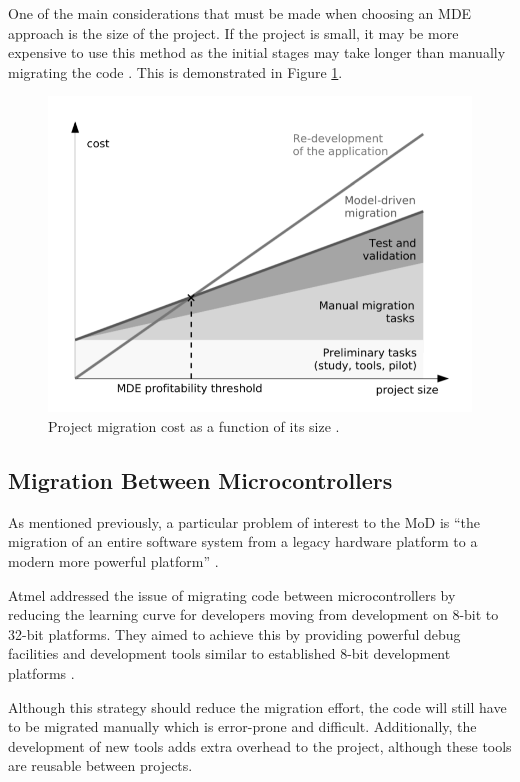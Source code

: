 \documentclass{UoYCSproject}
\begin{document}
One of the main considerations that must be made when choosing an MDE approach is the size of the project. If the project is small, it may be more expensive to use this method as the initial stages may take longer than manually migrating the code \parencite{fleurey2007model}. This is demonstrated in Figure \ref{fig:costvsize}.

\begin{figure}[h!]
  \centering
  \includegraphics[width=0.6\linewidth]{graphics/costvsize.png}
  \caption{Project migration cost as a function of its size \parencite{fleurey2007model}.}
  \label{fig:costvsize}
\end{figure}

\subsection{Migration Between Microcontrollers} \label{mc_migration}
As mentioned previously, a particular problem of interest to the MoD is ``the migration of an entire software system from a legacy hardware platform to a modern more powerful platform'' \parencite{gerasimou2017technical}.

Atmel addressed the issue of migrating code between microcontrollers by reducing the learning curve for developers moving from development on 8-bit to 32-bit platforms. They aimed to achieve this by providing powerful debug facilities and development tools similar to established 8-bit development platforms \parencite{wilbrink2004facilitating}.

Although this strategy should reduce the migration effort, the code will still have to be migrated manually which is error-prone and difficult. Additionally, the development of new tools adds extra overhead to the project, although these tools are reusable between projects.
\end{document}
